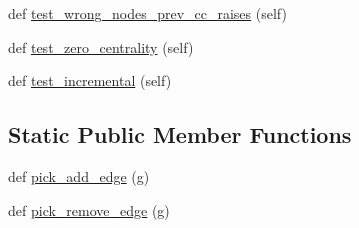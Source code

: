 \begin{DoxyCompactItemize}
\item 
def \hyperlink{classnetworkx_1_1algorithms_1_1centrality_1_1tests_1_1test__closeness__centrality_1_1TestClosenessCentrality_a8d7982ccc2189f24ed43ea648bf07c69}{test\+\_\+wrong\+\_\+nodes\+\_\+prev\+\_\+cc\+\_\+raises} (self)
\item 
def \hyperlink{classnetworkx_1_1algorithms_1_1centrality_1_1tests_1_1test__closeness__centrality_1_1TestClosenessCentrality_a41c5455e448fae5e39171620b8a23bb9}{test\+\_\+zero\+\_\+centrality} (self)
\item 
def \hyperlink{classnetworkx_1_1algorithms_1_1centrality_1_1tests_1_1test__closeness__centrality_1_1TestClosenessCentrality_a0aa87a64aa8fdda37cf0c3ca61c0667f}{test\+\_\+incremental} (self)
\end{DoxyCompactItemize}
\subsection*{Static Public Member Functions}
\begin{DoxyCompactItemize}
\item 
def \hyperlink{classnetworkx_1_1algorithms_1_1centrality_1_1tests_1_1test__closeness__centrality_1_1TestClosenessCentrality_a02bb4d70c66ef62449cd261c3db4e62f}{pick\+\_\+add\+\_\+edge} (g)
\item 
def \hyperlink{classnetworkx_1_1algorithms_1_1centrality_1_1tests_1_1test__closeness__centrality_1_1TestClosenessCentrality_a45b3aa08bb2e14b35495aa7c1742d187}{pick\+\_\+remove\+\_\+edge} (g)
\end{DoxyCompactItemize}
